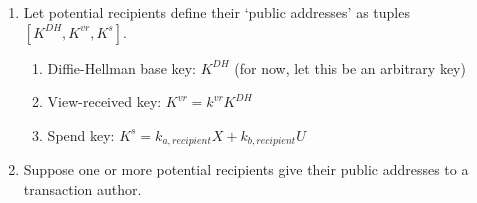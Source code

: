 \begin{enumerate}
    \item Let potential recipients define their `public addresses' as tuples $[K^{DH}, K^{vr}, K^s]$.
    \begin{enumerate}
        \item Diffie-Hellman base key: $K^{DH}$ (for now, let this be an arbitrary key)
        \item View-received key: $K^{vr} = k^{vr} K^{DH}$
        \item Spend key: $K^s = k_{a,recipient} X + k_{b,recipient} U$
    \end{enumerate}

    \item Suppose one or more potential recipients give their public addresses to a transaction author.


\end{enumerate}
